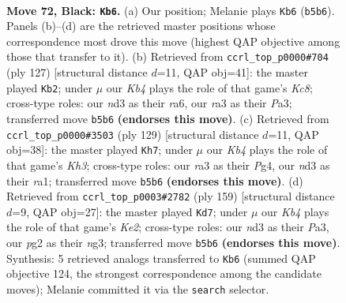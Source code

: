 \documentclass[11pt]{article}
\begin{document}
\clearpage

\begin{figure}[p]\centering
\begin{subfigure}{0.46\textwidth}\centering
\resizebox{\linewidth}{!}{%
\newchessgame
\chessboard[
  setfen={8/8/8/1k6/8/R2N4/5KPr/8 b - - 9 72},
  showmover=false,
  pgfstyle=straightmove, color=movearrow, markmove={b5-b6}
]}
\caption{}
\end{subfigure}\hfill
\begin{subfigure}{0.46\textwidth}\centering
\resizebox{\linewidth}{!}{%
\newchessgame
\chessboard[
  setfen={6r1/6P1/R5K1/8/8/p7/8/2k5 b - - 5 64},
  showmover=false,
  pgfstyle=straightmove, color=movearrow, markmove={c1-b2}
]}
\caption{}
\end{subfigure}
\\[4pt]
\begin{subfigure}{0.46\textwidth}\centering
\resizebox{\linewidth}{!}{%
\newchessgame
\chessboard[
  setfen={r7/P7/5K1k/8/6p1/8/8/R7 b - - 7 65},
  showmover=false,
  pgfstyle=straightmove, color=movearrow, markmove={h6-h7}
]}
\caption{}
\end{subfigure}\hfill
\begin{subfigure}{0.46\textwidth}\centering
\resizebox{\linewidth}{!}{%
\newchessgame
\chessboard[
  setfen={6R1/4k3/8/7K/8/p5N1/8/6r1 b - - 10 80},
  showmover=false,
  pgfstyle=straightmove, color=movearrow, markmove={e7-d7}
]}
\caption{}
\end{subfigure}
\caption{\textbf{Move 72, Black: \texttt{Kb6}.} (a) Our position; Melanie plays \texttt{Kb6} (\texttt{b5b6}). Panels (b)--(d) are the retrieved master positions whose correspondence most drove this move (highest QAP objective among those that transfer to it). (b) Retrieved from \texttt{ccrl\_top\_p0000\#704} (ply 127) [structural distance $d$=11, QAP obj=41]: the master played \texttt{Kb2}; under $\mu$ our \emph{Kb4} plays the role of that game's \emph{Kc8}; cross-type roles: our \emph{n}d3 as their \emph{r}a6, our \emph{r}a3 as their \emph{P}a3; transferred move \texttt{b5b6} \textbf{(endorses this move)}. (c) Retrieved from \texttt{ccrl\_top\_p0000\#3503} (ply 129) [structural distance $d$=11, QAP obj=38]: the master played \texttt{Kh7}; under $\mu$ our \emph{Kb4} plays the role of that game's \emph{Kh3}; cross-type roles: our \emph{r}a3 as their \emph{P}g4, our \emph{n}d3 as their \emph{r}a1; transferred move \texttt{b5b6} \textbf{(endorses this move)}. (d) Retrieved from \texttt{ccrl\_top\_p0003\#2782} (ply 159) [structural distance $d$=9, QAP obj=27]: the master played \texttt{Kd7}; under $\mu$ our \emph{Kb4} plays the role of that game's \emph{Ke2}; cross-type roles: our \emph{n}d3 as their \emph{P}a3, our \emph{p}g2 as their \emph{n}g3; transferred move \texttt{b5b6} \textbf{(endorses this move)}. Synthesis: 5 retrieved analogs transferred to \texttt{Kb6} (summed QAP objective 124, the strongest correspondence among the candidate moves); Melanie committed it via the \texttt{search} selector.}
\label{fig:thought-m143}
\end{figure}
\end{document}
